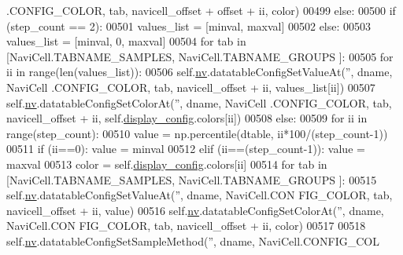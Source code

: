 \begin{DoxyCode}
      .CONFIG\_COLOR, tab, navicell\_offset + offset + ii, color)
00499                 \textcolor{keywordflow}{else}:
00500                     \textcolor{keywordflow}{if} (step\_count == 2):
00501                         values\_list = [minval, maxval]
00502                     \textcolor{keywordflow}{else}:
00503                         values\_list = [minval, 0, maxval]
00504                     \textcolor{keywordflow}{for} tab \textcolor{keywordflow}{in} [NaviCell.TABNAME\_SAMPLES, NaviCell.TABNAME\_GROUPS
      ]:
00505                         \textcolor{keywordflow}{for} ii \textcolor{keywordflow}{in} range(len(values\_list)):
00506                             self.\hyperlink{classnavicom_1_1navicom_1_1NaviCom_af740fe52f9f3cfc076ae88ca696bd05e}{nv}.datatableConfigSetValueAt(\textcolor{stringliteral}{''}, dname, NaviCell
      .CONFIG\_COLOR, tab, navicell\_offset + ii, values\_list[ii])
00507                             self.\hyperlink{classnavicom_1_1navicom_1_1NaviCom_af740fe52f9f3cfc076ae88ca696bd05e}{nv}.datatableConfigSetColorAt(\textcolor{stringliteral}{''}, dname, NaviCell
      .CONFIG\_COLOR, tab, navicell\_offset + ii, self.\hyperlink{classnavicom_1_1navicom_1_1NaviCom_a56628d774db59cb8b06af3801fb6306c}{display_config}.colors[ii])
00508             \textcolor{keywordflow}{else}:
00509                 \textcolor{keywordflow}{for} ii \textcolor{keywordflow}{in} range(step\_count):
00510                     value = np.percentile(dtable, ii*100/(step\_count-1))
00511                     \textcolor{keywordflow}{if} (ii==0): value = minval
00512                     \textcolor{keywordflow}{elif} (ii==(step\_count-1)): value = maxval
00513                     color = self.\hyperlink{classnavicom_1_1navicom_1_1NaviCom_a56628d774db59cb8b06af3801fb6306c}{display_config}.colors[ii]
00514                     \textcolor{keywordflow}{for} tab \textcolor{keywordflow}{in} [NaviCell.TABNAME\_SAMPLES, NaviCell.TABNAME\_GROUPS
      ]:
00515                         self.\hyperlink{classnavicom_1_1navicom_1_1NaviCom_af740fe52f9f3cfc076ae88ca696bd05e}{nv}.datatableConfigSetValueAt(\textcolor{stringliteral}{''}, dname, NaviCell.CON
      FIG\_COLOR, tab, navicell\_offset + ii, value)
00516                         self.\hyperlink{classnavicom_1_1navicom_1_1NaviCom_af740fe52f9f3cfc076ae88ca696bd05e}{nv}.datatableConfigSetColorAt(\textcolor{stringliteral}{''}, dname, NaviCell.CON
      FIG\_COLOR, tab, navicell\_offset + ii, color)
00517 
00518             self.\hyperlink{classnavicom_1_1navicom_1_1NaviCom_af740fe52f9f3cfc076ae88ca696bd05e}{nv}.datatableConfigSetSampleMethod(\textcolor{stringliteral}{''}, dname, NaviCell.CONFIG\_COL

\end{DoxyCode}
